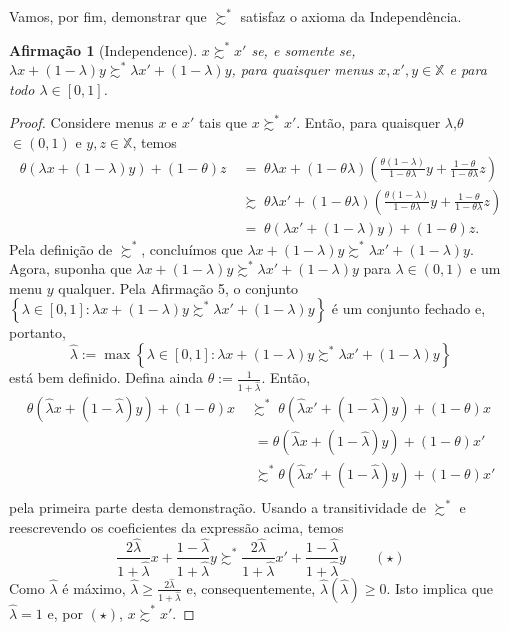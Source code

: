 \documentclass[12pt, a4paper]{article}
\theoremstyle{nonumberplain}
\newtheorem{proof}{Dem.}
\theoremstyle{plain}
\theoremstyle{plain}
\newtheorem{claim}{Afirmação}
\theoremstyle{plain}
\theoremstyle{nonumberplain}
\begin{document}
Vamos, por fim, demonstrar que $\succsim^*$ satisfaz o axioma da Independência.

\begin{claim}[Independence] $x\succsim^*x'$ se, e somente se, $\lambda x + (1-\lambda)y\succsim^* \lambda x' + (1-\lambda)y$, para quaisquer menus $x,x',y\in \mathbb{X}$ e para todo $\lambda \in [0,1]$.\end{claim}
\begin{proof}
Considere menus $x$ e $x'$ tais que $x\succsim^* x'$. Então, para quaisquer $\lambda$,$\theta$ $\in (0,1)$ e $y,z\in\mathbb{X}$, temos
\begin{align*}
\theta(\lambda x + (1-\lambda)y)+(1-\theta)z \;&=\; \theta\lambda x + (1-\theta\lambda)\left(\frac{\theta(1-\lambda)}{1-\theta\lambda}y+\frac{1-\theta}{1-\theta\lambda}z\right)\\
&\succsim\; \theta\lambda x' + (1-\theta\lambda)\left(\frac{\theta(1-\lambda)}{1-\theta\lambda}y+\frac{1-\theta}{1-\theta\lambda}z\right)\\
&=\; \theta(\lambda x' + (1-\lambda)y)+(1-\theta)z.
\end{align*}
Pela definição de $\succsim^*$, concluímos que $\lambda x + (1-\lambda)y\succsim^*\lambda x' + (1-\lambda)y$.
Agora, suponha que $\lambda x + (1-\lambda)y\succsim^*\lambda x' + (1-\lambda)y$ para $\lambda\in(0,1)$ e um menu $y$ qualquer. Pela Afirmação 5, o conjunto $\left\{\lambda\in[0,1]:\lambda x + (1-\lambda)y\succsim^*\lambda x' + (1-\lambda)y\right\}$ é um conjunto fechado e, portanto, $$\hat{\lambda}:=\max\left\{\lambda\in[0,1]:\lambda x + (1-\lambda)y\succsim^*\lambda x' + (1-\lambda)y\right\}$$ está bem definido. Defina ainda $\theta:=\frac{1}{1+\hat{\lambda}}$. Então,
\begin{align*}
\theta(\hat{\lambda}x+(1-\hat{\lambda})y)+(1-\theta)x\;&\succsim^*\;\theta(\hat{\lambda}x'+(1-\hat{\lambda})y)+(1-\theta)x\\
&\;= \theta(\hat{\lambda}x+(1-\hat{\lambda})y)+(1-\theta)x'\\
&\;\succsim^* \theta(\hat{\lambda}x'+(1-\hat{\lambda})y)+(1-\theta)x'\\
\end{align*} pela primeira parte desta demonstração. Usando a transitividade de $\succsim^*$ e reescrevendo os coeficientes da expressão acima, temos $$\frac{2\hat{\lambda}}{1+\hat{\lambda}}x+\frac{1-\hat{\lambda}}{1+\hat{\lambda}}y \succsim^* \frac{2\hat{\lambda}}{1+\hat{\lambda}}x'+\frac{1-\hat{\lambda}}{1+\hat{\lambda}}y \qquad (\star)$$ Como $\hat{\lambda}$ é máximo, $\hat{\lambda}\geq \frac{2\hat{\lambda}}{1+\hat{\lambda}}$ e, consequentemente, $\hat{\lambda}(\hat{\lambda})\geq 0$. Isto implica que $\hat{\lambda}=1$ e, por $(\star)$, $x\succsim^* x'$.
\end{proof}
\end{document}
